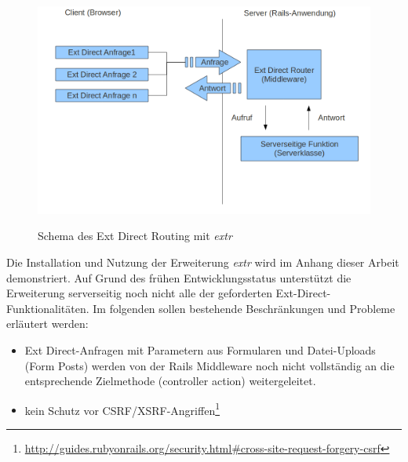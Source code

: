 \begin{figure}[!ht]
\begin{center}
\label{fig.directrouter}
\includegraphics[scale=0.55]{images/rack/extdirect.png}
\caption{Schema des Ext Direct Routing mit \emph{extr}}
\end{center}
\end{figure}

Die Installation und Nutzung der Erweiterung \emph{extr} wird im Anhang dieser Arbeit demonstriert. Auf Grund des frühen Entwicklungsstatus unterstützt die Erweiterung serverseitig noch nicht alle der geforderten Ext-Direct-Funktionalitäten. Im folgenden sollen bestehende Beschränkungen und Probleme erläutert werden:
\begin{itemize}
\item
Ext Direct-Anfragen mit Parametern aus Formularen und Datei-Uploads (Form Posts) werden von der Rails Middleware noch nicht vollständig an die entsprechende Zielmethode (controller action) weitergeleitet.
\item
kein Schutz vor CSRF/XSRF-Angriffen\footnote{\href{http://guides.rubyonrails.org/security.html\#cross-site-request-forgery-csrf}{http://guides.rubyonrails.org/security.html\#cross-site-request-forgery-csrf}}
\end{itemize}

